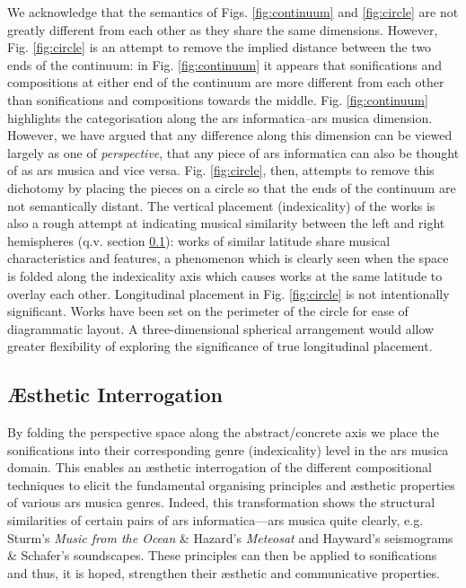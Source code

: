 \documentclass{article}
\begin{document}
We acknowledge that the semantics of Figs. \ref{fig:continuum} and \ref{fig:circle} are not greatly different from each other as they share the same dimensions. However, Fig. \ref{fig:circle} is an attempt to remove the implied distance between the two ends of the continuum: in Fig. \ref{fig:continuum} it appears that sonifications and compositions at either end of the continuum are more different from each other than sonifications and compositions towards the middle. Fig. \ref{fig:continuum} highlights the categorisation along the ars informatica--ars musica dimension. However, we have argued that any difference along this dimension can be viewed largely as one of {\it perspective}, that any piece of ars informatica can also be thought of as ars musica and vice versa. Fig. \ref{fig:circle}, then, attempts to remove this dichotomy by placing the pieces on a circle so that the ends of the continuum are not semantically distant. The vertical placement (indexicality) of the works is also a rough attempt at indicating musical similarity between the left and right hemispheres (q.v. section \ref{interrogation}): works of similar latitude share musical characteristics and features, a phenomenon which is clearly seen when the space is folded along the indexicality axis which causes works at the same latitude to overlay each other. Longitudinal placement in Fig. \ref{fig:circle} is not intentionally significant. Works have been set on the perimeter of the circle for ease of diagrammatic layout. A three-dimensional spherical arrangement would allow greater flexibility of exploring the significance of true longitudinal placement.

\subsection{Æsthetic Interrogation}\label{interrogation}
By folding the perspective space along the abstract/concrete axis we place the sonifications into their corresponding genre (indexicality) level in the ars musica domain. This enables an æsthetic interrogation of the different compositional techniques to elicit the fundamental organising principles and æsthetic properties of various ars musica genres. Indeed, this transformation shows the structural similarities of certain pairs of ars informatica---ars musica quite clearly, e.g. Sturm's \textit{Music from the Ocean} \& Hazard's \textit{Meteosat} and Hayward's seismograms \& Schafer's soundscapes. These principles can then be applied to sonifications and thus, it is hoped, strengthen their æsthetic and communicative properties.
\end{document}
